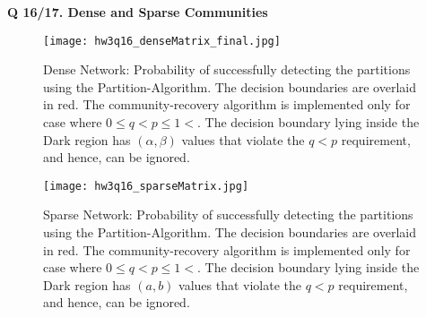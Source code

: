 \documentclass[9pt]{article}
\begin{document}
\hrulefill


\textbf{Q 16/17. Dense and Sparse Communities}


\begin{figure}[h!]
\centering
\texttt{[image: hw3q16\_denseMatrix\_final.jpg]}\\
\caption{Dense Network: Probability of successfully detecting the partitions using the Partition-Algorithm. The decision boundaries are overlaid in red. The community-recovery algorithm is implemented only for case where $0\leq q<p \leq 1<$. The decision boundary lying inside the Dark region has $(\alpha,\beta)$ values that violate the $q<p$ requirement, and hence, can be ignored. }
\label{fig:DenseNetwork}
\end{figure}




\begin{figure}[h!]
\centering
\texttt{[image: hw3q16\_sparseMatrix.jpg]}\\
\caption{Sparse Network: Probability of successfully detecting the partitions using the Partition-Algorithm. The decision boundaries are overlaid in red. The community-recovery algorithm is implemented only for case where $0\leq q<p \leq 1<$. The decision boundary lying inside the Dark region has $(a,b)$ values that violate the $q<p$ requirement, and hence, can be ignored. }
\label{fig:SparseNetwork}
\end{figure}
\end{document}
